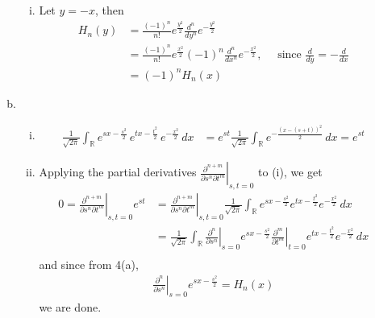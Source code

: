 \documentclass[a4paper,12pt]{article}
\theoremstyle{definition}
\begin{document}
\begin{enumerate}
\begin{enumerate}[(a)]
\begin{enumerate}[(i)]
\item Let $y=-x$, then
\begin{align*}
H_n(y) &= \frac{(-1)^n}{n!}e^{\frac{y^2}{2}}\frac{d^n}{dy^n}e^{-\frac{y^2}{2}}\\
&= \frac{(-1)^n}{n!}e^{\frac{x^2}{2}}(-1)^n\frac{d^n}{dx^n}e^{-\frac{x^2}{2}},\quad \text{ since $\frac{d}{dy}=-\frac{d}{dx}$}\\
&=(-1)^nH_n(x)
\end{align*}
\end{enumerate}

\item
\begin{enumerate}[(i)]
\item 
\begin{align*}
\frac{1}{\sqrt{2\pi}}\int_{\mathbb{R}}e^{sx-\frac{s^2}{2}}\,e^{tx-\frac{t^2}{2}}\,e^{-\frac{x^2}{2}}\,dx &=e^{st}\frac{1}{\sqrt{2\pi}}\int_{\mathbb{R}}e^{-\frac{(x-(s+t))^2}{2}}\,dx = e^{st}
\end{align*}
\item Applying the partial derivatives $\left.\frac{\partial^{n+m}}{\partial s^n\partial t^m}\right|_{s,t=0}$ to (i), we get
\begin{align*}
0=\left.\frac{\partial^{n+m}}{\partial s^n\partial t^m}\right|_{s,t=0}e^{st} &= \left.\frac{\partial^{n+m}}{\partial s^n\partial t^m}\right|_{s,t=0}\frac{1}{\sqrt{2\pi}}\int_{\mathbb{R}}e^{sx-\frac{s^2}{2}}e^{tx-\frac{t^2}{2}}e^{-\frac{x^2}{2}}\,dx\\&= \frac{1}{\sqrt{2\pi}}\int_{\mathbb{R}}\left.\frac{\partial^{n}}{\partial s^n}\right|_{s=0}e^{sx-\frac{s^2}{2}}\left.\frac{\partial^{m}}{\partial t^m}\right|_{t=0}e^{tx-\frac{t^2}{2}}e^{-\frac{x^2}{2}}\,dx\\
\end{align*}
 and since from 4(a),
\begin{align*}
\left.\frac{\partial^{n}}{\partial s^n}\right|_{s=0}e^{sx-\frac{s^2}{2}}=H_n(x)
\end{align*}
we are done.
\end{enumerate}
\end{enumerate}
\end{enumerate}
\end{document}
